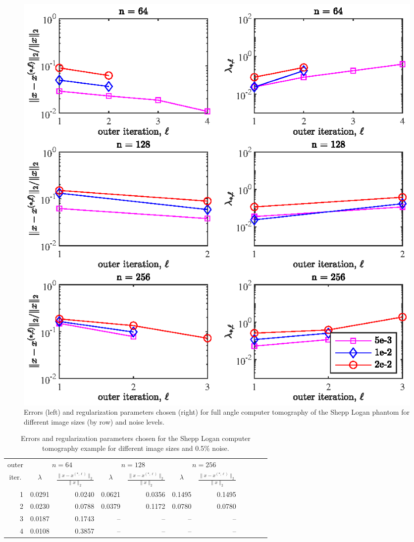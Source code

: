 \begin{figure}[htbp]
\begin{center}
\includegraphics{figures/shepp_logan_errs_and_reg_params}
\caption{Errors (left) and regularization parameters chosen (right) for full angle computer tomography of the Shepp Logan phantom for different image sizes (by row) and noise levels.}
\label{fig:shepp_logan_errs_and_reg_params}
\end{center}
\end{figure}
\begin{table}[htp]
\caption{Errors and regularization parameters chosen for the Shepp Logan computer tomography example for different image sizes and 0.5\% noise.}
\begin{center}
\begin{tabular}{|r|r|r|r|r|r|r|r|r|r|r|}
\hline
\multicolumn{1}{|c|}{outer} & \multicolumn{2}{c|}{$n = 64$} & \multicolumn{2}{c|}{$n = 128$} & \multicolumn{2}{c|}{$n = 256$} \\\cline{2-7}
\multicolumn{1}{|c|}{iter.} & \multicolumn{1}{c|}{$\lambda$} & \multicolumn{1}{c|}{$\frac{\|x - x^{(*,\ell)}\|_2}{\|x\|_2}$} & \multicolumn{1}{c|}{$\lambda$} & \multicolumn{1}{c|}{$\frac{\|x - x^{(*,\ell)}\|_2}{\|x\|_2}$}  & \multicolumn{1}{c|}{$\lambda$} & \multicolumn{1}{c|}{$\frac{\|x - x^{(*,\ell)}\|_2}{\|x\|_2}$} \\
\hline
1 & 0.0291 & 0.0240 & 0.0621 & 0.0356 & 0.1495 & 0.1495 \\
2 & 0.0230 & 0.0788 & 0.0379 & 0.1172 & 0.0780 & 0.0780 \\
3 & 0.0187 & 0.1743 & -- & -- & -- & -- \\
4 & 0.0108 & 0.3857 & -- & -- & -- & -- \\
\hline
\end{tabular}
\end{center}
\label{tab:shepp_logan_errs_and_reg_params}
\end{table}%
